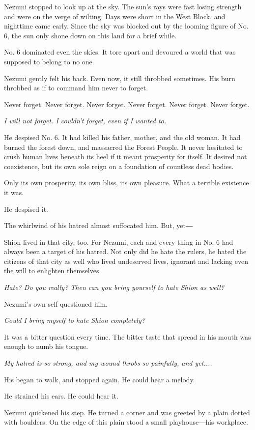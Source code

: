 Nezumi stopped to look up at the sky. The sun's rays were fast losing
strength and were on the verge of wilting. Days were short in the West
Block, and nighttime came early. Since the sky was blocked out by the
looming figure of No. 6, the sun only shone down on this land for a
brief while.

No. 6 dominated even the skies. It tore apart and devoured a world that
was supposed to belong to no one.

Nezumi gently felt his back. Even now, it still throbbed sometimes. His
burn throbbed as if to command him never to forget.

Never forget. Never forget. Never forget. Never forget. Never forget.
Never forget.

\emph{I will not forget. I couldn't forget, even if I wanted to.}

He despised No. 6. It had killed his father, mother, and the old woman.
It had burned the forest down, and massacred the Forest People. It never
hesitated to crush human lives beneath its heel if it meant prosperity
for itself. It desired not coexistence, but its own sole reign on a
foundation of countless dead bodies.

Only its own prosperity, its own bliss, its own pleasure. What a
terrible existence it was.

He despised it.

The whirlwind of his hatred almost suffocated him. But, yet―

Shion lived in that city, too. For Nezumi, each and every thing in No. 6
had always been a target of his hatred. Not only did he hate the rulers,
he hated the citizens of that city as well who lived undeserved lives,
ignorant and lacking even the will to enlighten themselves.

\emph{Hate? Do you really? Then can you bring yourself to hate Shion as well?}

Nezumi's own self questioned him.

\emph{Could I bring myself to hate Shion completely?}

It was a bitter question every time. The bitter taste that spread in his
mouth was enough to numb his tongue.

\emph{My hatred is so strong, and my wound throbs so painfully, and yet....}

His began to walk, and stopped again. He could hear a melody.~

He strained his ears. He could hear it.

Nezumi quickened his step. He turned a corner and was greeted by a plain
dotted with boulders. On the edge of this plain stood a small
playhouse―his workplace.

